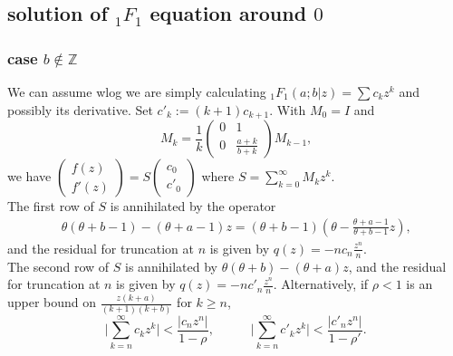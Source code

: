 \documentclass[12pt]{article}
\newcommand{\bbZ}[0]  { \mathbb{Z}}
\numberwithin{equation}{section}
\begin{document}
\subsection{solution of ${}_1 F_1$ equation around $0$}


\subsubsection{case $b \notin \bbZ$}
We can assume wlog we are simply calculating ${}_1 F_1(a;b|z) = \sum c_k z^k$ and possibly its derivative. Set $c'_k := (k+1)c_{k+1}$. With $M_0=I$ and
\begin{equation*}
M_k = \frac{1}{k}\begin{pmatrix} 0 & 1\\
0 & \frac{a+k}{b+k}\end{pmatrix} M_{k-1}\text{,}
\end{equation*}
we have $(\begin{smallmatrix} f(z) \\ f'(z) \end{smallmatrix}) = S (\begin{smallmatrix} c_0 \\ c'_0 \end{smallmatrix})$ where 
$S = \sum_{k=0}^{\infty} M_k z^k$.\\
The first row of $S$ is annihilated by the operator
\begin{gather*}
\theta(\theta+b-1) - (\theta+a-1)z = (\theta+b-1) ( \theta - \tfrac{\theta+a-1}{\theta+b-1} z)\text{,}
\end{gather*}
and the residual for truncation at $n$ is given by $q(z) = - n c_n \tfrac{z^n}{n}$.\\
The second row of $S$ is annihilated by $\theta(\theta+b) - (\theta+a)z$,
and the residual for truncation at $n$ is given by $q(z) = - n c'_n \tfrac{z^n}{n}$.
Alternatively, if $\rho<1$ is an upper bound on $\tfrac{z(k+a)}{(k+1)(k+b)}$ for $k\ge n$,
\begin{equation*}
\Big| \sum_{k=n}^{\infty} c_k z^k \Big| < \frac{|c_n z^n|}{1-\rho}\text{,} \quad \quad \quad
\Big| \sum_{k=n}^{\infty} c'_k z^k \Big| < \frac{|c'_n z^n|}{1-\rho'}\text{.}
\end{equation*}
\end{document}
